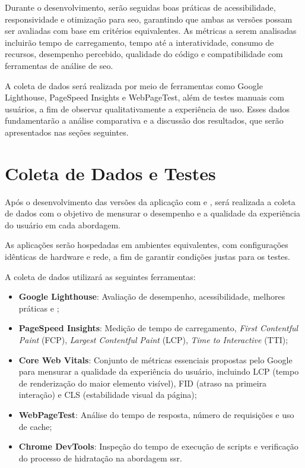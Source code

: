 Durante o desenvolvimento, serão seguidas boas práticas de acessibilidade, responsividade e otimização para \acrshort{seo}, garantindo que ambas as versões possam ser avaliadas com base em critérios equivalentes. As métricas a serem analisadas incluirão tempo de carregamento, tempo até a interatividade, consumo de recursos, desempenho percebido, qualidade do código e compatibilidade com ferramentas de análise de \acrshort{seo}.

A coleta de dados será realizada por meio de ferramentas como Google Lighthouse, PageSpeed Insights e WebPageTest, além de testes manuais com usuários, a fim de observar qualitativamente a experiência de uso. Esses dados fundamentarão a análise comparativa e a discussão dos resultados, que serão apresentados nas seções seguintes.


\section{Coleta de Dados e Testes}
\label{sec:coleta-de-dados-e-testes}

Após o desenvolvimento das versões da aplicação com  e , será realizada a coleta de dados com o objetivo de mensurar o desempenho e a qualidade da experiência do usuário em cada abordagem.

As aplicações serão hospedadas em ambientes equivalentes, com configurações idênticas de hardware e rede, a fim de garantir condições justas para os testes.

A coleta de dados utilizará as seguintes ferramentas:

\begin{itemize}
    \item \textbf{Google Lighthouse}: Avaliação de desempenho, acessibilidade, melhores práticas e ;
    \item \textbf{PageSpeed Insights}: Medição de tempo de carregamento, \textit{First Contentful Paint} (FCP), \textit{Largest Contentful Paint} (LCP), \textit{Time to Interactive} (TTI);
    \item \textbf{Core Web Vitals}: Conjunto de métricas essenciais propostas pelo Google para mensurar a qualidade da experiência do usuário, incluindo LCP (tempo de renderização do maior elemento visível), FID (atraso na primeira interação) e CLS (estabilidade visual da página);
    \item \textbf{WebPageTest}: Análise do tempo de resposta, número de requisições e uso de cache;
    \item \textbf{Chrome DevTools}: Inspeção do tempo de execução de scripts e verificação do processo de hidratação na abordagem \acrshort{ssr}.
\end{itemize}

